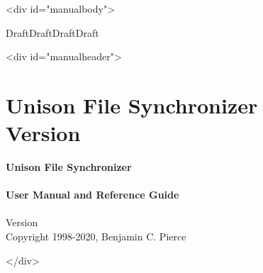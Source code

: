 \documentclass{article}
\begin{document}
\ifhevea\begin{rawhtml}<div id="manualbody">\end{rawhtml}\fi

\ifhevea\else\bigskip\fi%
\ifdraft%
\begin{center}%
{\Huge \ifhevea\red\fi DraftDraftDraftDraft}%
\end{center}%
\ifhevea\else \bigskip \fi
\fi

\ifhevea\begin{rawhtml}<div id="manualheader">\end{rawhtml}%
\else \thispagestyle{empty}
\fi%
%
\iftextversion
  \section*{Unison File Synchronizer
  \\
  Version
  \unisonversion
  }
\else%
  \ifhevea\else \vspace*{2in} \fi%
  \begin{center}%
  \Huge{\ifhevea\black\else\bf \fi Unison File  Synchronizer}%
  \ifhevea \\ \else \\[2ex] \fi%
  \huge {\ifhevea\black\else\bf \fi User Manual and Reference Guide}%
  \ifhevea \\ \else \\[6ex] \fi%
  \LARGE%
  Version \unisonversion \\[4ex] %
  \large Copyright 1998-2020, Benjamin C. Pierce
  \end{center}%
\fi%
%
%
\ifhevea\begin{rawhtml}</div>\end{rawhtml}\fi

\ifhevea\else\newpage\fi
\TABLEOFCONTENTS
\ifhevea\else\newpage\fi




\ifhevea\else\bigskip\fi

\end{document}
